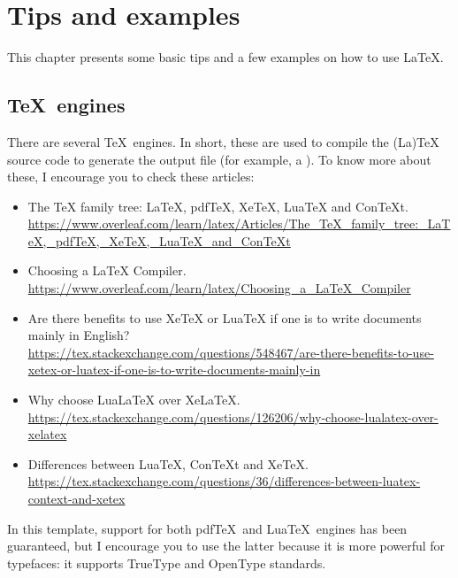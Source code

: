 \chapter{Tips and examples}
\label{c2}

This chapter presents some basic tips and a few examples on how to use \LaTeX.


\section{\TeX\ engines}
\label{c2:s:latex-engines}

There are several \TeX\ engines.
In short, these are used to compile the (La)TeX source code to generate the output file (for example, a ).
To know more about these, I encourage you to check these articles:

\begin{itemize}
\item
The TeX family tree: LaTeX, pdfTeX, XeTeX, LuaTeX and ConTeXt.\\
\url{https://www.overleaf.com/learn/latex/Articles/The_TeX_family_tree:_LaTeX,_pdfTeX,_XeTeX,_LuaTeX_and_ConTeXt}

\item
Choosing a LaTeX Compiler.\\
\url{https://www.overleaf.com/learn/latex/Choosing_a_LaTeX_Compiler}

\item
Are there benefits to use XeTeX or LuaTeX if one is to write documents mainly in English?\\
\url{https://tex.stackexchange.com/questions/548467/are-there-benefits-to-use-xetex-or-luatex-if-one-is-to-write-documents-mainly-in}

\item
Why choose LuaLaTeX over XeLaTeX.\\
\url{https://tex.stackexchange.com/questions/126206/why-choose-lualatex-over-xelatex}

\item
Differences between LuaTeX, ConTeXt and XeTeX.\\
\url{https://tex.stackexchange.com/questions/36/differences-between-luatex-context-and-xetex}

\end{itemize}

In this template, support for both pdf\TeX\ and Lua\TeX\ engines has been guaranteed, but I encourage you to use the latter because it is more powerful for typefaces: it supports TrueType and OpenType standards.


